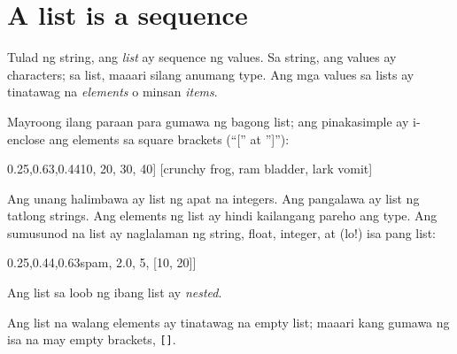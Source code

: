 \documentclass[10pt,]{book}
\newenvironment{Shaded}{}{}
\newcommand{\DecValTok}[1]{\textcolor[rgb]{0.25,0.63,0.44}{#1}}
\newcommand{\FloatTok}[1]{\textcolor[rgb]{0.25,0.63,0.44}{#1}}
\newcommand{\NormalTok}[1]{#1}
\newcommand{\StringTok}[1]{\textcolor[rgb]{0.25,0.44,0.63}{#1}}
\begin{document}
 

\section{A list is a sequence}\label{a-list-is-a-sequence}

Tulad ng string, ang \emph{list} ay sequence ng values. Sa string, ang
values ay characters; sa list, maaari silang anumang type. Ang mga
values sa lists ay tinatawag na \emph{elements} o minsan \emph{items}.

  

Mayroong ilang paraan para gumawa ng bagong list; ang pinakasimple ay
i-enclose ang elements sa square brackets (``{[}'' at ''{]}''):

\begin{Shaded}
\begin{Highlighting}[]
\NormalTok{[}\DecValTok{10}\NormalTok{, }\DecValTok{20}\NormalTok{, }\DecValTok{30}\NormalTok{, }\DecValTok{40}\NormalTok{]}
\NormalTok{[}\StringTok{\textquotesingle{}crunchy frog\textquotesingle{}}\NormalTok{, }\StringTok{\textquotesingle{}ram bladder\textquotesingle{}}\NormalTok{, }\StringTok{\textquotesingle{}lark vomit\textquotesingle{}}\NormalTok{]}
\end{Highlighting}
\end{Shaded}

Ang unang halimbawa ay list ng apat na integers. Ang pangalawa ay list
ng tatlong strings. Ang elements ng list ay hindi kailangang pareho ang
type. Ang sumusunod na list ay naglalaman ng string, float, integer, at
(lo!) isa pang list:

\begin{Shaded}
\begin{Highlighting}[]
\NormalTok{[}\StringTok{\textquotesingle{}spam\textquotesingle{}}\NormalTok{, }\FloatTok{2.0}\NormalTok{, }\DecValTok{5}\NormalTok{, [}\DecValTok{10}\NormalTok{, }\DecValTok{20}\NormalTok{]]}
\end{Highlighting}
\end{Shaded}

Ang list sa loob ng ibang list ay \emph{nested}.

 

Ang list na walang elements ay tinatawag na empty list; maaari kang
gumawa ng isa na may empty brackets, \texttt{{[}{]}}.

 
\end{document}
